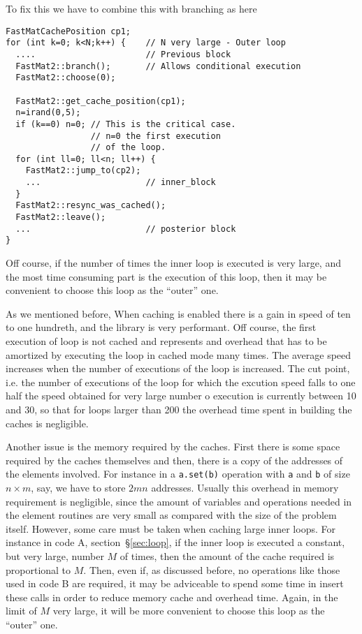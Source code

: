 To fix this we have to combine this with branching as here
%
\begin{verbatim}
FastMatCachePosition cp1;
for (int k=0; k<N;k++) {    // N very large - Outer loop 
  ....                      // Previous block
  FastMat2::branch();       // Allows conditional execution 
  FastMat2::choose(0);
  
  FastMat2::get_cache_position(cp1);  
  n=irand(0,5);
  if (k==0) n=0; // This is the critical case. 
                 // n=0 the first execution
    	         // of the loop. 
  for (int ll=0; ll<n; ll++) {
    FastMat2::jump_to(cp2);
    ...                     // inner_block
  }
  FastMat2::resync_was_cached();
  FastMat2::leave();
  ...                       // posterior block
}
\end{verbatim}
%
Off course, if the number of times the inner loop is executed is very
large, and the most time consuming part is the execution of this loop,
then it may be convenient to choose this loop as the ``outer'' one. 



As we mentioned before, When caching is enabled there is a gain in
speed of ten to one hundreth, and the library is very performant. Off
course, the first execution of loop is not cached and represents and
overhead that has to be amortized by executing the loop in cached mode
many times. The average speed increases when the number of executions
of the loop is increased. The cut point, i.e. the number of executions
of the loop for which the excution speed falls to one half the speed
obtained for very large number o execution is currently between 10 and
30, so that for loops larger than 200 the overhead time spent in
building the caches is negligible. 

Another issue is the memory required by the caches. First there is
some space required by the caches themselves and then, there is a copy
of the addresses of the elements involved. For instance in a
\verb+a.set(b)+ operation with \verb+a+ and \verb+b+ of size $n\times
m$, say, we have to store $2mn$ addresses. Usually this overhead in
memory requirement is negligible, since the amount of variables and
operations needed in the element routines are very small as compared
with the size of the problem itself. However, some care must be taken
when caching large inner loops. For instance in code A,
section~\S\ref{sec:loop}, if the inner loop is executed a constant,
but very large, number $M$ of times, then the amount of the cache
required is proportional to $M$. Then, even if, as discussed before,
no operations like those used in code B are required, it may be
adviceable to spend some time in insert these calls in order to reduce
memory cache and overhead time. Again, in the limit of $M$ very large,
it will be more convenient to choose this loop as the ``outer'' one.

